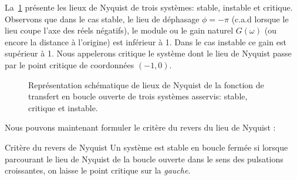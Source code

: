 La~\cref{fig-nyquist_revers} présente 
les lieux de Nyquist de trois systèmes: stable, instable et critique. Observons
que dans le cas stable, le lieu de déphasage $\phi=-\pi$ (c.a.d lorsque le lieu
coupe l'axe des réels négatifs), le module ou le gain naturel $G(\omega)$ (ou 
encore la distance à l'origine) est inférieur à 1. Dans le cas instable ce gain 
est supérieur à 1. Nous appelerons critique le système dont le lieu de Nyquist 
passe par le point critique de coordonnées $(-1,0)$.
\begin{figure}[!h]
    \centering
    
    \caption{Représentation schématique de lieux de Nyquist de la fonction 
             de transfert en boucle ouverte de trois systèmes asservis: 
             stable, critique et instable. \label{fig-nyquist_revers}}
\end{figure}

Nous pouvons maintenant formuler le critère du revers du lieu de Nyquist :
\begin{criteria}{Critère du revers de Nyquist}
    Un système est stable en boucle fermée si lorsque parcourant 
    le lieu de Nyquist de la boucle ouverte dans le sens des 
    pulsations croissantes, on laisse le point critique sur la 
    \emph{gauche}.
\end{criteria}
\newpage
